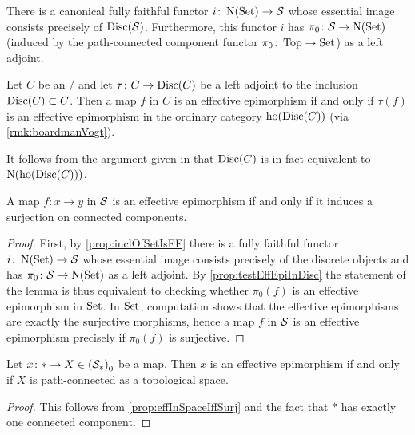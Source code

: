 \begin{prop}\label{prop:inclOfSetIsFF}
    There is a canonical fully faithful functor $i\colon\operatorname{N}(\operatorname{Set})\to\mathcal{S}$ whose essential image consists precisely of $\operatorname{Disc}(\mathcal{S})$.
    Furthermore, this functor $i$ has $\pi_0\colon\mathcal{S}\to\operatorname{N}(\operatorname{Set})$ (induced by the path-connected component functor $\pi_0\colon\operatorname{Top}\to\operatorname{Set}$) as a left adjoint.
    \begin{reference}
        \cite[Proposition 7.8.3]{cisinski_2019}
    \end{reference}
\end{prop}
\begin{prop}\label{prop:testEffEpiInDisc}
    Let $C$ be an \inftytop/ and let $\tau\colon C\to\operatorname{Disc}(C)$ be a left adjoint to the inclusion $\operatorname{Disc}(C)\subset C$.
    Then a map $f$ in $C$ is an effective epimorphism if and only if $\tau(f)$ is an effective epimorphism in the ordinary category $\operatorname{ho}(\operatorname{Disc}(C))$ (via \cref{rmk:boardmanVogt}).
    \begin{reference}
        \cite[Proposition 7.2.1.14]{HTT}
    \end{reference}
\end{prop}
\begin{remark}
    It follows from the argument given in \cite[Notation 5.5.6.2]{HTT} that $\operatorname{Disc}(C)$ is in fact equivalent to $\operatorname{N}(\operatorname{ho}(\operatorname{Disc}(C)))$.
\end{remark}
\begin{prop}\label{prop:effInSpaceIffSurj}
    A map $f\colon x\to y$ in $\mathcal{S}$ is an effective epimorphism if and only if it induces a surjection on connected components.
    \begin{proof}
        First, by \cref{prop:inclOfSetIsFF} there is a fully faithful functor $i\colon\operatorname{N}(\operatorname{Set})\to\mathcal{S}$ whose essential image consists precisely of the discrete objects and has $\pi_0\colon\mathcal{S}\to\operatorname{N}(\operatorname{Set})$ as a left adjoint.
        By \cref{prop:testEffEpiInDisc} the statement of the lemma is thus equivalent to checking whether $\pi_0(f)$ is an effective epimorphism in $\operatorname{Set}$.
        In $\operatorname{Set}$, computation shows that the effective epimorphisms are exactly the surjective morphisms, hence a map $f$ in $\mathcal{S}$ is an effective epimorphism precisely if $\pi_0(f)$ is surjective.
    \end{proof}
\end{prop}
\begin{corollary}
    Let $x\colon*\to X\in\left(\mathcal{S}_*\right)_0$ be a map.
    Then $x$ is an effective epimorphism if and only if $X$ is path-connected as a topological space.
    \begin{proof}
        This follows from \cref{prop:effInSpaceIffSurj} and the fact that $*$ has exactly one connected component.
    \end{proof}
\end{corollary}